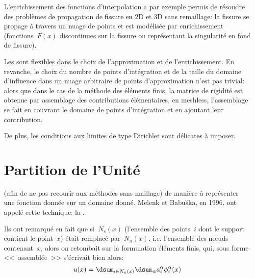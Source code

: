 L'enrichissement des fonctions d'interpolation a par exemple permis de résoudre des problèmes 
de propagation de fissure en 2D et 3D sans remaillage: la fissure se propage à travers un nuage de points 
et est modélisée par enrichissement (fonctions~$F(x)$ discontinues sur la fissure ou représentant la 
singularité en fond de fissure).

\medskip
Les  
sont flexibles dans le choix de l'approximation et de l'enrichissement. 
En revanche, le choix du nombre de points d'intégration et de la taille du
domaine d'influence dans un nuage arbitraire de points d'approximation n'est pas trivial:
alors que dans le cas de la méthode des éléments finis, la matrice de rigidité est obtenue par assemblage des contributions
élémentaires, en meshless, l'assemblage se fait en couvrant le domaine de points d'intégration et 
en ajoutant leur contribution.

De plus, les conditions aux limites de type Dirichlet sont délicates à imposer.



\medskip
\section{Partition de l'Unité}\label{Sec-partition}

 (afin de ne pas recourir aux méthodes 
sans maillage) de manière à représenter une fonction donnée sur un domaine donné. 
Melenk et 
Babu\u{s}ka,
en 1996, ont appelé cette technique: 
la . 

Ils ont remarqué en fait que si~$N_s(x)$ (l'ensemble des points~$i$ dont le support contient le point~$x$)
était remplacé par~$N_n(x)$, i.e. l'ensemble des nœuds contenant~$x$, alors on retombait
sur la formulation éléments finis, qui, sous forme <<~assemblée~>> s'écrivait bien alors:
\begin{equation}
u(x) = \dsum_{i\in N_n(x)}\dsum_{\alpha} a_i^\alpha \phi_i^\alpha(x)
\end{equation}

